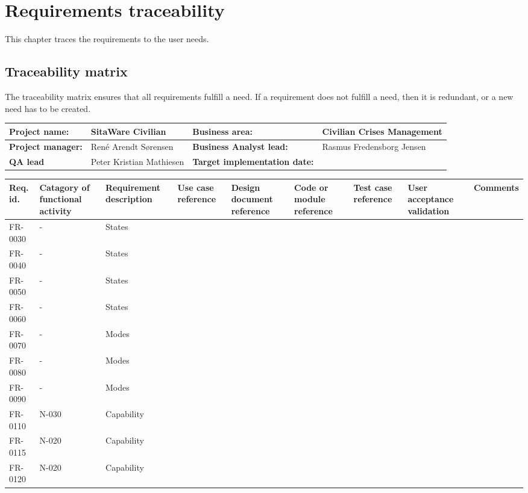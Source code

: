 \chapter{Requirements traceability}
This chapter traces the requirements to the user needs.

\section{Traceability matrix}
The traceability matrix ensures that all requirements fulfill a need. If a requirement does not fulfill a need, then it is redundant, or a new need has to be created.


\begin{sidewaystable}
\begin{table}[H]
\begin{tabular}{|l|l|l|l|}
\hline
 \textbf{Project name:} & SitaWare Civilian & \textbf{Business area:}  & Civilian Crises Management\\ \hline
 \textbf{Project manager:} & René Arendt Sørensen & \textbf{Business Analyst lead:} & Rasmus Fredensborg  Jensen\\ \hline
 \textbf{QA lead} & Peter Kristian Mathiesen & \textbf{Target implementation date:}  & \\ \hline
\end{tabular}	
\begin{tabular}{|p{2cm}|p{2cm}|p{3cm}|p{2cm}|p{2cm}|p{2cm}|p{2cm}|p{2cm}|p{2cm}|}
\hline
 Req. id. & Catagory of functional activity & Requirement description  & Use case reference & Design document reference & Code or module reference & Test case reference & User acceptance validation & Comments\\ \hline
 FR-0030 & - & States & & & & & &\\ \hline 
FR-0040 & - & States & & & & & &\\ \hline  
FR-0050 & - & States & & & & & &\\ \hline  
FR-0060 & - & States & & & & & &\\ \hline  
FR-0070 & - & Modes & & & & & &\\ \hline  
FR-0080 & - & Modes & & & & & &\\ \hline 
FR-0090 & - & Modes & & & & & &\\ \hline 
 FR-0110 & N-030 & Capability & & & & & &\\ \hline
 FR-0115 & N-020 & Capability & & & & & &\\ \hline
 FR-0120 & N-020 & Capability & & & & & &\\ \hline

\end{tabular}
\end{table}
\end{sidewaystable}
